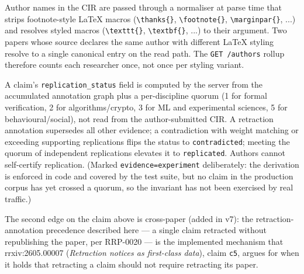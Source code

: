 \documentclass[11pt]{rrxiv}
\begin{document}
\begin{claim}[title=Author names are LaTeX-normalised, type=empirical, evidence=experiment, labels={protocol-invariant}]
\label{claim:author-name-normalisation}
Author names in the CIR are passed through a normaliser at parse time that strips footnote-style LaTeX macros (\texttt{\textbackslash thanks\{\}}, \texttt{\textbackslash footnote\{\}}, \texttt{\textbackslash marginpar\{\}}, ...) and resolves styled macros (\texttt{\textbackslash texttt\{\}}, \texttt{\textbackslash textbf\{\}}, ...) to their argument. Two papers whose source declares the same author with different LaTeX styling resolve to a single canonical entry on the read path. The \texttt{GET /authors} rollup therefore counts each researcher once, not once per styling variant.
\end{claim}

\begin{claim}[title=Replication status is server-derived, type=empirical, evidence=experiment, labels={protocol-invariant}]
\label{claim:replication-status-server-derived}
A claim's \texttt{replication\_status} field is computed by the server from the accumulated annotation graph plus a per-discipline quorum (1 for formal verification, 2 for algorithms/crypto, 3 for ML and experimental sciences, 5 for behavioural/social), not read from the author-submitted CIR. A retraction annotation supersedes all other evidence; a contradiction with weight matching or exceeding supporting replications flips the status to \texttt{contradicted}; meeting the quorum of independent replications elevates it to \texttt{replicated}. Authors cannot self-certify replication. (Marked \texttt{evidence=experiment} deliberately: the derivation is enforced in code and covered by the test suite, but no claim in the production corpus has yet crossed a quorum, so the invariant has not been exercised by real traffic.)
\end{claim}

The second edge on the claim above is cross-paper (added in v7): the retraction-annotation precedence described here --- a single claim retracted without republishing the paper, per RRP-0020 --- is the implemented mechanism that rrxiv:2605.00007 (\emph{Retraction notices as first-class data}), claim \texttt{c5}, argues for when it holds that retracting a claim should not require retracting its paper.
\end{document}
